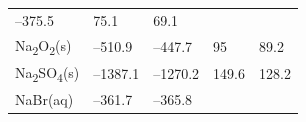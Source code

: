 \documentclass[
  9pt,
]{extbook}
\theoremstyle{definition}
\theoremstyle{definition}
\theoremstyle{definition}
\theoremstyle{remark}
\begin{document}
\begin{longtable}[]{@{}lllll@{}}
\begin{minipage}[t]{0.20\columnwidth}
--375.5\strut
\end{minipage} & \begin{minipage}[t]{0.18\columnwidth}\raggedright
75.1\strut
\end{minipage} & \begin{minipage}[t]{0.18\columnwidth}\raggedright
69.1\strut
\end{minipage}\tabularnewline
\begin{minipage}[t]{0.10\columnwidth}\raggedright
Na\textsubscript{2}O\textsubscript{2}(s)\strut
\end{minipage} & \begin{minipage}[t]{0.19\columnwidth}\raggedright
--510.9\strut
\end{minipage} & \begin{minipage}[t]{0.20\columnwidth}\raggedright
--447.7\strut
\end{minipage} & \begin{minipage}[t]{0.18\columnwidth}\raggedright
95\strut
\end{minipage} & \begin{minipage}[t]{0.18\columnwidth}\raggedright
89.2\strut
\end{minipage}\tabularnewline
\begin{minipage}[t]{0.10\columnwidth}\raggedright
Na\textsubscript{2}SO\textsubscript{4}(s)\strut
\end{minipage} & \begin{minipage}[t]{0.19\columnwidth}\raggedright
--1387.1\strut
\end{minipage} & \begin{minipage}[t]{0.20\columnwidth}\raggedright
--1270.2\strut
\end{minipage} & \begin{minipage}[t]{0.18\columnwidth}\raggedright
149.6\strut
\end{minipage} & \begin{minipage}[t]{0.18\columnwidth}\raggedright
128.2\strut
\end{minipage}\tabularnewline
\begin{minipage}[t]{0.10\columnwidth}\raggedright
NaBr(aq)\strut
\end{minipage} & \begin{minipage}[t]{0.19\columnwidth}\raggedright
--361.7\strut
\end{minipage} & \begin{minipage}[t]{0.20\columnwidth}\raggedright
--365.8\strut
\end{minipage} & \begin{minipage}[t]{0.18\columnwidth}\raggedright

\end{minipage}
\end{longtable}
\end{document}
